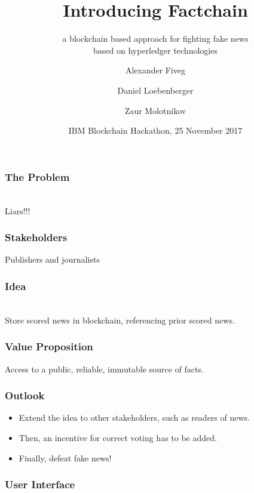 \documentclass[aspectratio=169]{beamer}
\title{Introducing Factchain}
\subtitle{a blockchain based approach for fighting fake news\\based on hyperledger technologies}
\author{Alexander Fiveg \and Daniel Loebenberger \and Zaur Molotnikov}
\institute{\texttt{\{afiveg,dloeb,zmolo\}@genua.de}}
\date{IBM Blockchain Hackathon, 25 November 2017}
\begin{document}
\frame[plain]{\titlepage}

\begin{frame}
\frametitle{The Problem}

\begin{center}
\\
Liars!!!
\end{center}
\end{frame}

\begin{frame}
\frametitle{Stakeholders}

\begin{center}

Publishers and journalists
\end{center}
\end{frame}

\begin{frame}
\frametitle{Idea}

\begin{center}
\\[1em]

Store scored news in blockchain, referencing prior scored news.
\end{center}
\end{frame}

\begin{frame}
\frametitle{Value Proposition}

\begin{center}

Access to a public, reliable, immutable source of facts.
\end{center}
\end{frame}

\begin{frame}
\frametitle{Outlook}

\begin{minipage}[6cm]{7.5cm}
\begin{itemize}
\item Extend the idea to other stakeholders, such as readers of news.
\item Then, an incentive for correct voting has to be added.
\item Finally, defeat fake news!
\end{itemize}
\end{minipage}
\hfill
\begin{minipage}[5cm]{6cm}
\end{minipage}
\end{frame}

\begin{frame}
\frametitle{User Interface}

\begin{center}
\end{center}
\end{frame}
\end{document}
